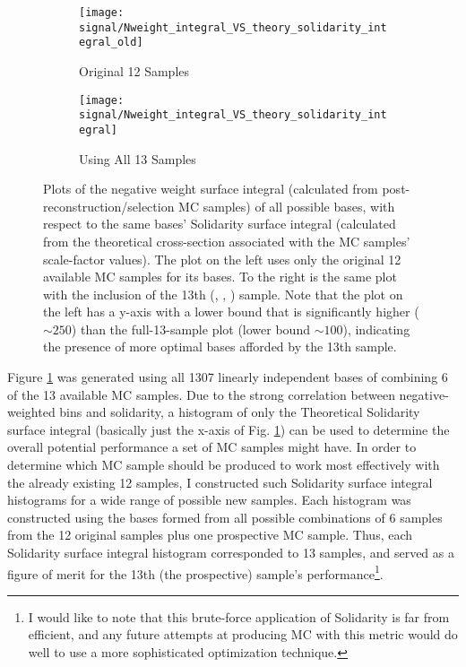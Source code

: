     \begin{figure}[tbh]
        \begin{subfigure}{0.5\textwidth}
            \texttt{[image: signal/Nweight\_integral\_VS\_theory\_solidarity\_integral\_old]}
            \captionsetup{justification=centering} \caption{Original 12 Samples}
        \end{subfigure}
        \begin{subfigure}{0.5\textwidth}
            \texttt{[image: signal/Nweight\_integral\_VS\_theory\_solidarity\_integral]}
            \captionsetup{justification=centering} \caption{Using All 13 Samples}
        \end{subfigure}
        \caption{
            Plots of the negative weight surface integral (calculated from post-reconstruction/selection MC samples)
                of all possible bases, with respect to the same bases' Solidarity surface integral
                (calculated from the theoretical cross-section associated with the MC samples' scale-factor values).
            The plot on the left uses only the original 12 available MC samples for its bases.
            To the right is the same plot with the inclusion of the 13th (, , ) sample.
            Note that the plot on the left has a y-axis with a lower bound that is significantly higher ($\sim 250$) 
                than the full-13-sample plot (lower bound $\sim 100$),
                indicating the presence of more optimal bases afforded by the 13th sample.
        }
        \label{fig:nWeight_solidarity_scatter}
    \end{figure}
    \FloatBarrier


    Figure \ref{fig:nWeight_solidarity_scatter} was generated using all 1307 linearly independent bases of combining 6 of the 13 available MC samples.
    Due to the strong correlation between negative-weighted bins and solidarity,
        a histogram of only the Theoretical Solidarity surface integral
        (basically just the x-axis of Fig. \ref{fig:nWeight_solidarity_scatter})
        can be used to determine the overall potential performance a set of MC samples might have.
    In order to determine which MC sample should be produced to work most effectively with the already existing 12 samples,
        I constructed such Solidarity surface integral histograms for a wide range of possible new samples.
    Each histogram was constructed using the bases formed from all possible combinations of 6 samples from
        the 12 original samples plus one prospective MC sample.
    Thus, each Solidarity surface integral histogram corresponded to 13 samples,
        and served as a figure of merit for the 13th (the prospective) sample's performance\footnote{
            I would like to note that this brute-force application of Solidarity is far from efficient,
                and any future attempts at producing MC with this metric
                would do well to use a more sophisticated optimization technique.
        }.

